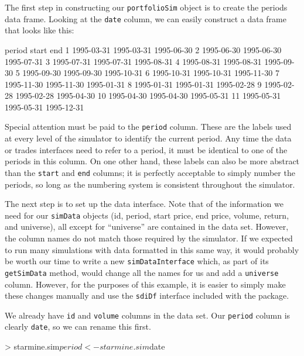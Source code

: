 \documentclass{article}
\begin{document}
The first step in constructing our \texttt{portfolioSim} object is to
create the periods data frame.  Looking at the \texttt{date} column,
we can easily construct a data frame that looks like this:

\begin{Schunk}
\begin{Soutput}
       period      start        end
1  1995-03-31 1995-03-31 1995-06-30
2  1995-06-30 1995-06-30 1995-07-31
3  1995-07-31 1995-07-31 1995-08-31
4  1995-08-31 1995-08-31 1995-09-30
5  1995-09-30 1995-09-30 1995-10-31
6  1995-10-31 1995-10-31 1995-11-30
7  1995-11-30 1995-11-30 1995-01-31
8  1995-01-31 1995-01-31 1995-02-28
9  1995-02-28 1995-02-28 1995-04-30
10 1995-04-30 1995-04-30 1995-05-31
11 1995-05-31 1995-05-31 1995-12-31
\end{Soutput}
\end{Schunk}

Special attention must be paid to the \texttt{period} column.  These
are the labels used at every level of the simulator to identify the
current period.  Any time the data or trades interfaces need to refer
to a period, it must be identical to one of the periods in this
column.  On one other hand, these labels can also be more abstract
than the \texttt{start} and \texttt{end} columns; it is perfectly
acceptable to simply number the periods, so long as the numbering
system is consistent throughout the simulator.

The next step is to set up the data interface.  Note that of the
information we need for our \texttt{simData} objects (id, period,
start price, end price, volume, return, and universe), all except for
``universe'' are contained in the data set.  However, the column names
do not match those required by the simulator.  If we expected to run
many simulations with data formatted in this same way, it would
probably be worth our time to write a new \texttt{simDataInterface}
which, as part of its \texttt{getSimData} method, would change all the
names for us and add a \texttt{universe} column.  However, for the
purposes of this example, it is easier to simply make these changes
manually and use the \texttt{sdiDf} interface included with the
package.

We already have \texttt{id} and \texttt{volume} columns in the data
set.  Our \texttt{period} column is clearly \texttt{date}, so we can
rename this first.

\begin{Schunk}
\begin{Sinput}
> starmine.sim$period <- starmine.sim$date
\end{Sinput}
\end{Schunk}
\end{document}

